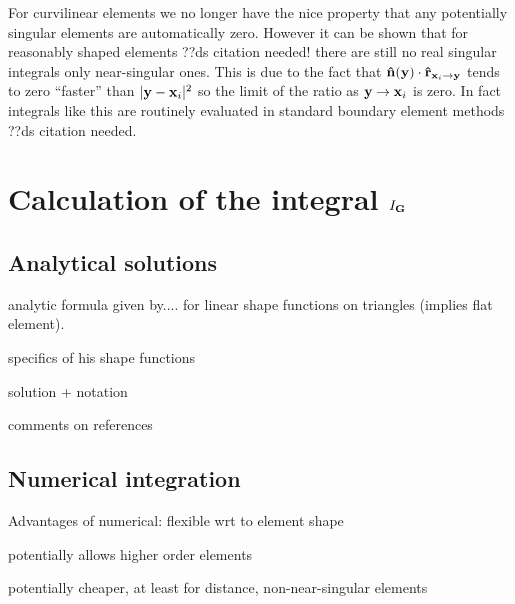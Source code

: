 For curvilinear elements we no longer have the nice property that any potentially singular elements are automatically zero. However it can be shown that for reasonably shaped elements ??ds citation needed! there are still no real singular integrals only near-singular ones. This is due to the fact that $\mathbf{\hat{n}}(\mathbf{y}) \cdot \mathbf{\hat{r}}_{\mathbf{x}_{{i}} \rightarrow \mathbf{y}}$ tends to zero ``faster'' than $\lvert \mathbf{y} - \mathbf{x}_{i} \rvert^2$ so the limit of the ratio as $\mathbf{y} \rightarrow \mathbf{x}_{i}$ is zero. In fact integrals like this are routinely evaluated in standard boundary element methods ??ds citation needed.






\section{Calculation of the integral $I_{\mathbf{G}}$}

\subsection{Analytical solutions}

analytic formula given by.... for linear shape functions on triangles (implies flat element).

specifics of his shape functions

solution + notation

comments on references


\subsection{Numerical integration}

Advantages of numerical: flexible wrt to element shape

potentially allows higher order elements

potentially cheaper, at least for distance, non-near-singular elements




